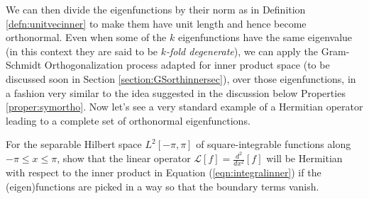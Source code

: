 We can then divide the eigenfunctions by their norm as in Definition \ref{defn:unitvecinner} to make them have unit length and hence become orthonormal. Even when some of the $k$ eigenfunctions have the same eigenvalue (in this context they are said to be \textit{$k$-fold degenerate}), we can apply the Gram-Schmidt Orthogonalization process adapted for inner product space (to be discussed soon in Section \ref{section:GSorthinnersec}), over those eigenfunctions, in a fashion very similar to the idea suggested in the discussion below Properties \ref{proper:symortho}. Now let's see a very standard example of a Hermitian operator leading to a complete set of orthonormal eigenfunctions.
\begin{exmp}
\label{exmp:Fourierbasis}
For the separable Hilbert space $L^2[-\pi, \pi]$ of square-integrable functions along $-\pi \leq x \leq \pi$, show that the linear operator $\mathcal{L}[f] = \frac{d^2}{dx^2}[f]$ will be Hermitian with respect to the inner product in Equation (\ref{eqn:integralinner}) if the (eigen)functions are picked in a way so that the boundary terms vanish.
\end{exmp}
